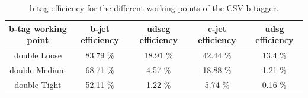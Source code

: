 


\begin{table}[h!t]
 \centering
 \caption{b-tag efficiency for the different working points of the CSV b-tagger.}
 \begin{tabular}{c|c|c|c|c}
  b-tag working point 	& b-jet efficiency 	& udscg efficiency 	& c-jet efficiency 	& udsg efficiency 	\\
  \hline
  double Loose 		& 83.79 $\%$		& 18.91 $\%$		& 42.44 $\%$ 		& 13.4 $\%$		\\
  double Medium 	& 68.71 $\%$		& 4.57 $\%$		& 18.88 $\%$		& 1.21 $\%$		\\
  double Tight 		& 52.11 $\%$ 		& 1.22 $\%$ 		& 5.74 $\%$ 		& 0.16 $\%$ 		\\
 \end{tabular}
\end{table}


